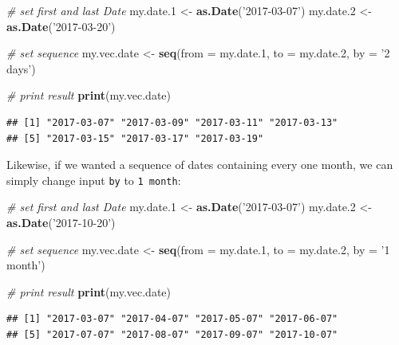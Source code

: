 \documentclass[11pt,]{book}
\newenvironment{Shaded}{\begin{snugshade}}{\end{snugshade}}
\newcommand{\KeywordTok}[1]{\textcolor[rgb]{0.27,0.27,0.27}{\textbf{#1}}}
\newcommand{\DataTypeTok}[1]{\textcolor[rgb]{0.27,0.27,0.27}{#1}}
\newcommand{\DecValTok}[1]{\textcolor[rgb]{0.06,0.06,0.06}{#1}}
\newcommand{\StringTok}[1]{\textcolor[rgb]{0.5,0.5,0.5}{#1}}
\newcommand{\CommentTok}[1]{\textcolor[rgb]{0.56,0.35,0.01}{\textit{#1}}}
\newcommand{\NormalTok}[1]{#1}
\begin{document}
\begin{Shaded}
\begin{Highlighting}[]
\CommentTok{# set first and last Date}
\NormalTok{my.date.}\DecValTok{1}\NormalTok{ <-}\StringTok{ }\KeywordTok{as.Date}\NormalTok{(}\StringTok{'2017-03-07'}\NormalTok{)}
\NormalTok{my.date.}\DecValTok{2}\NormalTok{ <-}\StringTok{ }\KeywordTok{as.Date}\NormalTok{(}\StringTok{'2017-03-20'}\NormalTok{)}

\CommentTok{# set sequence}
\NormalTok{my.vec.date <-}\StringTok{ }\KeywordTok{seq}\NormalTok{(}\DataTypeTok{from =}\NormalTok{ my.date.}\DecValTok{1}\NormalTok{, }
                   \DataTypeTok{to =}\NormalTok{ my.date.}\DecValTok{2}\NormalTok{, }
                   \DataTypeTok{by =} \StringTok{'2 days'}\NormalTok{)}

\CommentTok{# print result}
\KeywordTok{print}\NormalTok{(my.vec.date)}
\end{Highlighting}
\end{Shaded}

\begin{verbatim}
## [1] "2017-03-07" "2017-03-09" "2017-03-11" "2017-03-13"
## [5] "2017-03-15" "2017-03-17" "2017-03-19"
\end{verbatim}

Likewise, if we wanted a sequence of dates containing every one month,
we can simply change input \texttt{by} to
\texttt{\textquotesingle{}1\ month\textquotesingle{}}:

\begin{Shaded}
\begin{Highlighting}[]
\CommentTok{# set first and last Date}
\NormalTok{my.date.}\DecValTok{1}\NormalTok{ <-}\StringTok{ }\KeywordTok{as.Date}\NormalTok{(}\StringTok{'2017-03-07'}\NormalTok{)}
\NormalTok{my.date.}\DecValTok{2}\NormalTok{ <-}\StringTok{ }\KeywordTok{as.Date}\NormalTok{(}\StringTok{'2017-10-20'}\NormalTok{)}

\CommentTok{# set sequence}
\NormalTok{my.vec.date <-}\StringTok{ }\KeywordTok{seq}\NormalTok{(}\DataTypeTok{from =}\NormalTok{ my.date.}\DecValTok{1}\NormalTok{, }
                   \DataTypeTok{to =}\NormalTok{ my.date.}\DecValTok{2}\NormalTok{, }
                   \DataTypeTok{by =} \StringTok{'1 month'}\NormalTok{)}

\CommentTok{# print result}
\KeywordTok{print}\NormalTok{(my.vec.date)}
\end{Highlighting}
\end{Shaded}

\begin{verbatim}
## [1] "2017-03-07" "2017-04-07" "2017-05-07" "2017-06-07"
## [5] "2017-07-07" "2017-08-07" "2017-09-07" "2017-10-07"
\end{verbatim}
\end{document}
